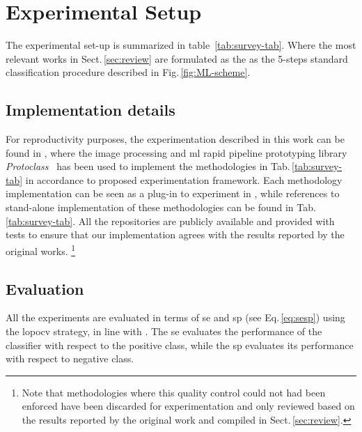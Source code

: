 \graphicspath{ {./content/method/figures/} }

\section{Experimental Setup}\label{sec:exp}

The experimental set-up is summarized in table~\ref{tab:survey-tab}.
Where the most relevant works in Sect.\,\ref{sec:review} are formulated as the as the 5-steps standard classification procedure described in Fig.\,\ref{fig:ML-scheme}.



\subsection{Implementation details}\label{sec:exp:implementation}
For reproductivity purposes, the experimentation described in this work can be found in \cite{rethinopaty20016apr-repoICPR},
where the image processing and \gls{ml} rapid pipeline prototyping library \emph{Protoclass}~\cite{protoclass2016apr-repoICPR} has been used to implement the methodologies in Tab.\,\ref{tab:survey-tab} in accordance to proposed experimentation framework.
Each methodology implementation can be seen as a plug-in to experiment in \cite{rethinopaty20016apr-repoICPR}, while references to stand-alone implementation of these methodologies can be found in Tab.\,\ref{tab:survey-tab}.
All the repositories are publicly available and provided with tests to ensure that our implementation agrees with the results reported by the original works.
\footnote{Note that methodologies where this quality control could not had been enforced have been discarded for experimentation and only reviewed based on the results reported by the original work and compiled in Sect.\,\ref{sec:review}.}

\subsection{Evaluation}\label{sec:exp:evaluation}
All the experiments are evaluated in terms of \gls{se} and \gls{sp} (see Eq.\,\ref{eq:sesp}) using the \gls{lopocv} strategy, in line with \cite{Lemaintre2015miccaiOCT}.
The \gls{se} evaluates the performance of the classifier with respect to the positive class, while the \gls{sp} evaluates its performance with respect to negative class.

